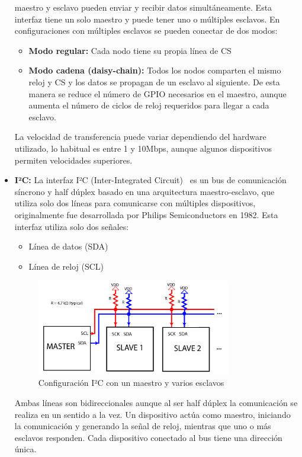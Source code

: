 \begin{itemize}
    maestro y esclavo pueden enviar y recibir datos simultáneamente.
    Esta interfaz tiene un solo maestro y puede tener uno o múltiples esclavos.
    En configuraciones con múltiples esclavos se pueden conectar de dos modos:
    \begin{itemize}
        \item \textbf{Modo regular:} Cada nodo tiene su propia línea de CS
        \item \textbf{Modo cadena (daisy-chain):} Todos los nodos comparten el mismo reloj y CS y los datos se propagan de un esclavo al siguiente.
        De esta manera se reduce el número de GPIO necesarios en el maestro, aunque aumenta el número de ciclos de reloj requeridos para llegar a cada esclavo.
    \end{itemize}
    La velocidad de transferencia puede variar dependiendo del hardware utilizado, lo habitual es entre 1 y 10Mbps, aunque algunos dispositivos permiten velocidades superiores.

    \item \textbf{I²C:} La interfaz I²C (Inter-Integrated Circuit)~\cite{i2c_specification} es un bus de comunicación síncrono y half dúplex basado en una arquitectura maestro-esclavo, que utiliza solo dos líneas para comunicarse con múltiples dispositivos,
    originalmente fue desarrollada por Philips Semiconductors en 1982.
    Esta interfaz utiliza solo dos señales:
    \begin{itemize}
        \item Línea de datos (SDA)
        \item Línea de reloj (SCL)
    \end{itemize}
    \begin{figure}[h]
        \centering
        \includegraphics[width=0.8\textwidth]{Imagenes/Bitmap/i2c}
        \caption{Configuración I²C con un maestro y varios esclavos}
        \label{fig:i2c}
    \end{figure}
    Ambas líneas son bidireccionales aunque al ser half dúplex la comunicación se realiza en un sentido a la vez.
    Un dispositivo actúa como maestro, iniciando la comunicación y generando la señal de reloj, mientras que uno o más esclavos responden.
    Cada dispositivo conectado al bus tiene una dirección única.


\end{itemize}

